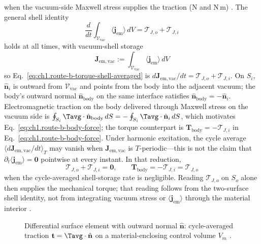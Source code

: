 when the vacuum-side Maxwell stress supplies the traction (N and N\,m) \cite{stratton1941,harrington2001}. The general shell identity
\begin{equation}
\label{eq:ch1.route-b-torque-shell-averaged}
\frac{d}{dt}\int_{\mathcal{V}_{\mathrm{vac}}}\langle\mathbf{j}_{\mathrm{em}}\rangle\,dV
=\boldsymbol{\mathcal{T}}_{J,o}+\boldsymbol{\mathcal{T}}_{J,i}
\end{equation}
holds at all times, with vacuum-shell storage
\begin{equation}
\label{eq:ch1.J-em-vac-def}
\mathbf{J}_{\mathrm{em,vac}}:=\int_{\mathcal{V}_{\mathrm{vac}}}\langle\mathbf{j}_{\mathrm{em}}\rangle\,dV
\end{equation}
so Eq.~\eqref{eq:ch1.route-b-torque-shell-averaged} is $d\mathbf{J}_{\mathrm{em,vac}}/dt=\boldsymbol{\mathcal{T}}_{J,o}+\boldsymbol{\mathcal{T}}_{J,i}$. On $S_i$, $\hat{\mathbf{n}}_i$ is outward from $\mathcal{V}_{\mathrm{vac}}$ and points from the body into the adjacent vacuum; the body's outward normal $\hat{\mathbf{n}}_{\mathrm{body}}$ on the same interface satisfies $\hat{\mathbf{n}}_{\mathrm{body}}=-\hat{\mathbf{n}}_i$. Electromagnetic traction on the body delivered through Maxwell stress on the vacuum side is $\oint_{S_i}\Tavg\cdot\hat{\mathbf{n}}_{\mathrm{body}}\,dS=-\oint_{S_i}\Tavg\cdot\hat{\mathbf{n}}_i\,dS$, which motivates Eq.~\eqref{eq:ch1.route-b-body-force}; the torque counterpart is $\mathbf{T}_{\mathrm{body}}=-\boldsymbol{\mathcal{T}}_{J,i}$ in Eq.~\eqref{eq:ch1.route-b-body-force}. Under harmonic excitation, the cycle average $\langle d\mathbf{J}_{\mathrm{em,vac}}/dt\rangle_T$ may vanish when $\mathbf{J}_{\mathrm{em,vac}}$ is $T$-periodic---this is not the claim that $\partial_t\langle\mathbf{j}_{\mathrm{em}}\rangle=\mathbf{0}$ pointwise at every instant. In that reduction,
\begin{equation}
\label{eq:ch1.route-b-body-torque-steady}
\boldsymbol{\mathcal{T}}_{J,o}+\boldsymbol{\mathcal{T}}_{J,i}=\mathbf{0},\qquad
\mathbf{T}_{\mathrm{body}}=-\boldsymbol{\mathcal{T}}_{J,i}=\boldsymbol{\mathcal{T}}_{J,o}
\end{equation}
when the cycle-averaged shell-storage rate is negligible. Reading $\boldsymbol{\mathcal{T}}_{J,o}$ on $S_o$ alone then supplies the mechanical torque; that reading follows from the two-surface shell identity, not from integrating vacuum stress or $\langle\mathbf{j}_{\mathrm{em}}\rangle$ through the material interior \cite{stratton1941,harrington2001,beth1936}.

\begin{figure}[t]
\centering
\VolIPhysFig{\VolIPhysStressTraction}
\caption{Differential surface element with outward normal $\hat{\mathbf{n}}$: cycle-averaged traction $\mathbf{t}=\Tavg\cdot\hat{\mathbf{n}}$ on a material-enclosing control volume $V_m$ \cite{maxwell1873,stratton1941}.}
\label{fig:ch1.stress-traction-element}
\end{figure}

